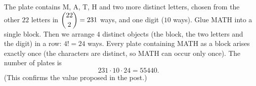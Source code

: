 The plate contains M, A, T, H and two more distinct letters, chosen from the other $22$ letters in $\dbinom{22}{2}=231$ ways, and one digit ($10$ ways). Glue MATH into a single block. Then we arrange $4$ distinct objects (the block, the two letters and the digit) in a row: $4!=24$ ways. Every plate containing MATH as a block arises exactly once (the characters are distinct, so MATH can occur only once). The number of plates is
\[231\cdot10\cdot24=\boxed{55440}.\]
(This confirms the value proposed in the post.)
